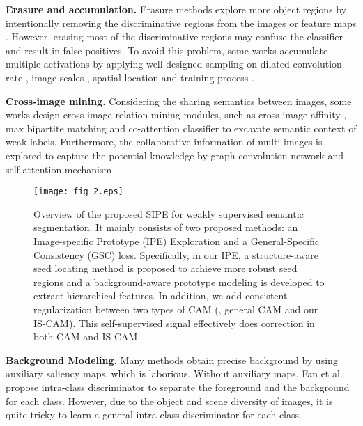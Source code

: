 \documentclass[10pt,twocolumn,letterpaper]{article}
\begin{document}
\noindent\textbf{Erasure and accumulation.} Erasure methods explore more object regions by intentionally removing the discriminative regions from the images \cite{wei2017object,Kweon2021unlock,sun2021ecs} or feature maps \cite{hou2018self,choe2020attention}.
However, erasing most of the discriminative regions may confuse the classifier and result in false positives.
To avoid this problem, some works accumulate multiple activations by applying well-designed sampling on dilated convolution rate \cite{wei2018revisiting}, image scales \cite{zhang2020reliability}, spatial location \cite{lee2019ficklenet} and training process \cite{jiang2019integral}.

\noindent\textbf{Cross-image mining.} Considering the sharing semantics between images, some works design cross-image relation mining modules, such as cross-image affinity \cite{fan2020cian}, max bipartite matching \cite{liu2020weakly} and co-attention classifier \cite{sun2020mining} to excavate semantic context of weak labels.
Furthermore, the collaborative information of multi-images is explored to capture the potential knowledge by graph convolution network \cite{li2021group} and self-attention mechanism \cite{wu2021embed}.

\begin{figure*}[!t]
    \centering
    \texttt{[image: fig\_2.eps]}
    \caption{Overview of the proposed SIPE for weakly supervised semantic segmentation. It mainly consists of two proposed methods: an Image-specific Prototype (IPE) Exploration and a General-Specific Consistency (GSC) loss. Specifically, in our IPE, a structure-aware seed locating method is proposed to achieve more robust seed regions and a background-aware prototype modeling is developed to extract hierarchical features. In addition, we add consistent regularization between two types of CAM (\ie, general CAM and our IS-CAM). This self-supervised signal effectively does correction in both CAM and IS-CAM.}
    \label{fig:fig2}
\end{figure*}

\noindent\textbf{Background Modeling.}
Many methods \cite{kim2021discriminative,lee2021railroad,yao2021non,xu2021leveraging} obtain precise background by using auxiliary saliency maps, which is laborious.
Without auxiliary maps, Fan et al. \cite{fan2020learning} propose intra-class discriminator to separate the foreground and the background for each class.
However, due to the object and scene diversity of images, it is quite tricky to learn a general intra-class discriminator for each class.
\end{document}
